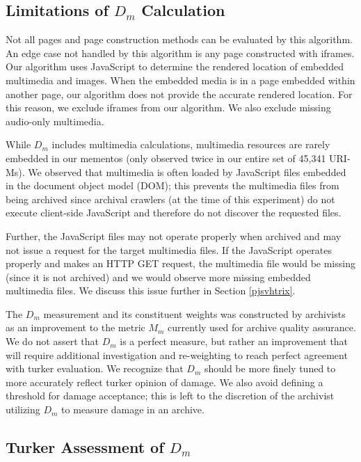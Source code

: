 \subsection{Limitations of $D_m$ Calculation}
Not all pages and page construction methods can be evaluated by this algorithm. An edge case not handled by this algorithm is any page constructed with iframes. Our algorithm uses JavaScript to determine the rendered location of embedded multimedia and images. When the embedded media is in a page embedded within another page, our algorithm does not provide the accurate rendered location. For this reason, we exclude iframes from our algorithm. We also exclude missing audio-only multimedia.

While $D_m$ includes multimedia calculations, multimedia resources are rarely embedded in our mementos (only observed twice in our entire set of 45,341 URI-Ms). We observed that multimedia is often loaded by JavaScript files embedded in the document object model (DOM); this prevents the multimedia files from being archived since archival crawlers (at the time of this experiment) do not execute client-side JavaScript and therefore do not discover the requested files. 

Further, the JavaScript files may not operate properly when archived \cite{robustifyBlog} and may not issue a request for the target multimedia files. If the JavaScript operates properly and makes an HTTP GET request, the multimedia file would be missing (since it is not archived) and we would observe more missing embedded multimedia files. We discuss this issue further in Section \ref{pjsvhtrix}. %

The $D_m$ measurement and its constituent weights was constructed by archivists as an improvement to the metric $M_m$ currently used for archive quality assurance. We do not assert that $D_m$ is a perfect measure, but rather an improvement that will require additional investigation and re-weighting to reach perfect agreement with turker evaluation. We recognize that $D_m$ should be more finely tuned to more accurately reflect turker opinion of damage.  We also avoid defining a threshold for damage acceptance; this is left to the discretion of the archivist utilizing $D_m$ to measure damage in an archive.

\subsection{Turker Assessment of $D_m$}
\label{turkerDm}


